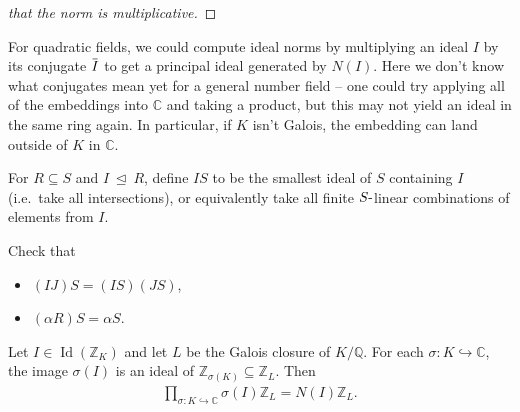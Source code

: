 \begin{proof}[that the norm is multiplicative]
\end{proof}

\begin{remark}

For quadratic fields, we could compute ideal norms by multiplying an
ideal \(I\) by its conjugate
\(\mkern 1.5mu\overline{\mkern-1.5muI\mkern-1.5mu}\mkern 1.5mu\) to get
a principal ideal generated by \(N(I)\). Here we don't know what
conjugates mean yet for a general number field -- one could try applying
all of the embeddings into \({\mathbb{C}}\) and taking a product, but
this may not yield an ideal in the same ring again. In particular, if
\(K\) isn't Galois, the embedding can land outside of \(K\) in
\({\mathbb{C}}\).

\end{remark}

\begin{definition}

For \(R \subseteq S\) and \(I{~\trianglelefteq~}R\), define \(IS\) to be
the smallest ideal of \(S\) containing \(I\) (i.e.~take all
intersections), or equivalently take all finite \(S{\hbox{-}}\)linear
combinations of elements from \(I\).

\end{definition}

\begin{exercise}

Check that

\begin{itemize}
\tightlist
\item
  \((IJ)S = (IS)(JS)\),
\item
  \((\alpha R)S = \alpha S\).
\end{itemize}

\end{exercise}

\begin{theorem}

Let \(I\in \operatorname{Id}({\mathbb{Z}}_K)\) and let \(L\) be the
Galois closure of \(K/{\mathbb{Q}}\). For each
\(\sigma: K\hookrightarrow{\mathbb{C}}\), the image \(\sigma(I)\) is an
ideal of \({\mathbb{Z}}_{\sigma(K)} \subseteq {\mathbb{Z}}_L\). Then
\begin{align*}
\prod_{\sigma: K\hookrightarrow{\mathbb{C}}} \sigma(I) {\mathbb{Z}}_L = N(I) {\mathbb{Z}}_L
.\end{align*}

\end{theorem}

